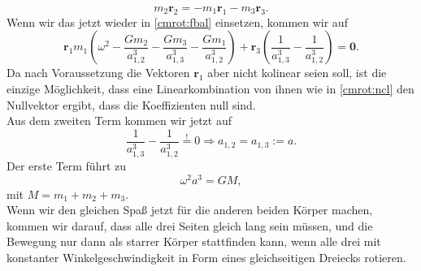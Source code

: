 \begin{Answer}[ref = cmrot]
	\begin{equation}\label{cmrot:r2}
		m_2\mathbf{r}_2 = -m_1 \mathbf{r}_1 - m_3 \mathbf{r}_3.
	\end{equation}
	Wenn wir das jetzt wieder in \eqref{cmrot:fbal} einsetzen, kommen wir auf
	\begin{equation}\label{cmrot:ncl}
		\mathbf{r}_1m_1 \left(\omega^2 - \frac{Gm_2}{a_{1,2}^3} - \frac{Gm_3}{a_{1,3}^3} - \frac{Gm_1}{a_{1,2}^3}\right) + \mathbf{r}_{3} \left(\frac{1}{a_{1,3}^3} - \frac{1}{a_{1,2}^3} \right) = \mathbf{0}.
	\end{equation}
	Da nach Voraussetzung die Vektoren $\mathbf{r}_1$ aber nicht kolinear seien soll, ist die einzige Möglichkeit, dass eine Linearkombination von ihnen wie in \eqref{cmrot:ncl} den Nullvektor ergibt, dass die Koeffizienten null sind.\\
	Aus dem zweiten Term kommen wir jetzt auf 
	\begin{equation}\label{cmrot:el}
		\frac{1}{a_{1,3}^3} - \frac{1}{a_{1,2}^3} \overset{!}{=} 0 \Rightarrow a_{1,2} = a_{1,3}:= a.
	\end{equation}
	Der erste Term führt zu
	\begin{equation}
		\omega^2 a^3 = GM,
	\end{equation}
	mit $M = m_1+m_2+m_3$. \\
	Wenn wir den gleichen Spaß jetzt für die anderen beiden Körper machen, kommen wir darauf, dass alle drei Seiten gleich lang sein müssen, und die Bewegung nur dann als starrer Körper stattfinden kann, wenn alle drei mit konstanter Winkelgeschwindigkeit in Form eines gleichseitigen Dreiecks rotieren.
\end{Answer}

